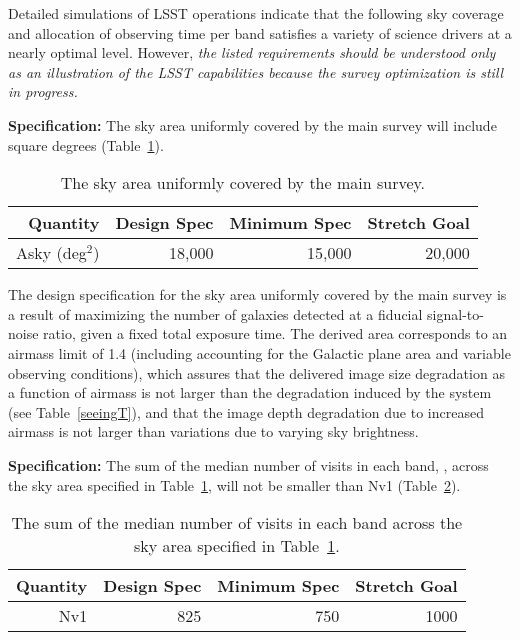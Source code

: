 Detailed simulations of LSST operations 
indicate that the following sky coverage and
allocation of observing time per band satisfies a variety of science drivers at a
nearly optimal level. However, {\it the listed requirements should be
understood only as an illustration of the LSST capabilities because
the survey optimization is still in progress.}


{\bf Specification:} The sky area uniformly covered by the main
survey will include
square degrees (Table~\ref{TskyArea}).

\begin{table}[h]
\begin{tabular}{|r|r|r|r|}
\hline
 Quantity            & Design Spec & Minimum Spec & Stretch Goal     \\
\hline
 Asky  (deg$^2$)   &  18,000      &  15,000       &  20,000        \\
\hline
\end{tabular}
\caption{The sky area uniformly covered by the main survey.}
\label{TskyArea}
\end{table}

The design specification for the sky area uniformly covered by the main
survey is a result of maximizing the number of galaxies detected at a
fiducial signal-to-noise ratio, given a fixed total exposure time.
The derived area corresponds to an airmass limit of 1.4 (including
accounting for the Galactic plane area and variable observing conditions),
which assures that the delivered image size degradation as a function of
airmass is not larger than the degradation induced by the system
(see Table~\ref{seeingT}), and that the image depth degradation due to
increased airmass is not larger than variations due to varying
sky brightness.



{\bf Specification:} The sum of the median number of visits in each
band,
,
across the sky area specified in Table~\ref{TskyArea},
will not be smaller than Nv1 (Table~\ref{Nv1table}).
\begin{table}[h]
\begin{tabular}{|r|r|r|r|}
\hline
 Quantity            & Design Spec & Minimum Spec & Stretch Goal     \\
\hline
     Nv1             &   825   &   750     &    1000     \\
\hline
\end{tabular}
\caption{ The sum of the median number of visits in each
band across the sky area specified in Table~\ref{TskyArea}.}
\label{Nv1table}
\end{table}


